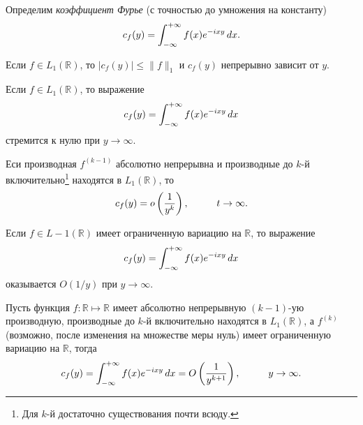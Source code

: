\begin{to_def}
    Определим \textit{коэффициент Фурье} (с точностью до умножения на константу)
    \begin{equation*}
        c_f (y) = \int_{-\infty}^{+\infty} f(x) e^{-ixy} \, d x.
    \end{equation*}
\end{to_def}

\begin{to_thr}[]
    Если $f \in L_1 (\mathbb{R})$, то $|c_f (y)| \leq \|f\|_1$ и $c_f (y)$ непрерывно зависит от $y$.
\end{to_thr}

\begin{to_thr}
    Если $f \in L_1 (\mathbb{R})$, то выражение
    \begin{equation*}
        c_f (y) = \int_{-\infty}^{+\infty} f(x) e^{-ixy} \, d x
    \end{equation*}
    стремится к нулю при $y \to \infty$.
\end{to_thr}

\begin{to_lem}
    Еси производная $f^{(k-1)}$ абсолютно непрерывна и производные до $k$-й включительно\footnote{
        Для $k$-й достаточно существования почти всюду.
    }  находятся в $L_1 (\mathbb{R})$, то
    \begin{equation*}
        c_f (y) = o \left(\frac{1}{y^k}\right),
        \hspace{1 cm}
        t \to \infty.
    \end{equation*}
\end{to_lem}

\begin{to_thr}[]
    Если $f \in L-1 (\mathbb{R})$ имеет ограниченную вариацию на $\mathbb{R}$, то выражение
    \begin{equation*}
        c_f (y) = \int_{-\infty}^{+\infty} f(x) e^{-ixy} \, d x
    \end{equation*}
    оказывается $O(1/y)$ при $y \to \infty$.
\end{to_thr}

\begin{to_con}
    Пусть функция $f \colon \mathbb{R} \mapsto \mathbb{R}$ имеет абсолютно непрерывную $(k-1)$-ую производную, производные до $k$-й включительно находятся в $L_1 (\mathbb{R})$, а $f^{(k)}$ (возможно, после изменения на множестве меры нуль) имеет ограниченную вариацию на $\mathbb{R}$, тогда
    \begin{equation*}
        c_f (y) = \int_{-\infty}^{+\infty} 
        f(x) e^{-ixy} \, d x =
        O\left(\frac{1}{y^{k+1}}\right), 
        \hspace{1 cm}
        y \to \infty.
    \end{equation*}
\end{to_con}



